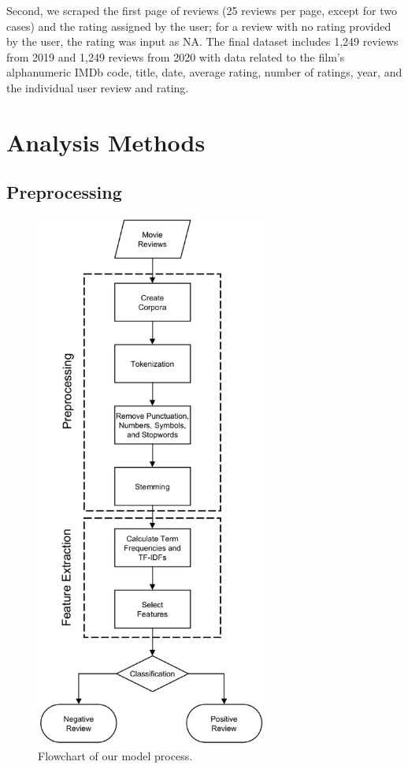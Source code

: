 \documentclass[conference]{IEEEtran}
\begin{document}
Second, we scraped the first page of reviews (25 reviews per page, except for two cases) and the rating assigned by the user; for a review with no rating provided by the user, the rating was input as NA. The final dataset includes 1,249 reviews from 2019 and 1,249 reviews from 2020 with data related to the film's alphanumeric IMDb code, title, date, average rating, number of ratings, year, and the individual user review and rating.

\section{Analysis Methods}\label{sec:Methods}
\subsection{Preprocessing}\label{sec:Preprocessing}

\begin{figure}[tbp]
    \centerline{\includegraphics[width=3in]{figures/Pipeline.eps}}
    \caption{Flowchart of our model process.}
    \label{fig:Pipeline}
\end{figure}
\end{document}
